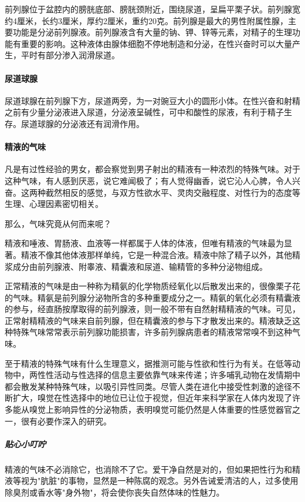 \begin{enumerate}
前列腺位于盆腔内的膀胱底部、膀胱颈附近，围绕尿道，呈扁平栗子状。前列腺宽约4厘米，长约3厘米，厚约2厘米，重约20克。前列腺是最大的男性附属性腺，主要功能是分泌前列腺液。前列腺液含有大量的钠、钾、锌等元素，对精子的生理功能有重要的影响。这种液体由腺体细胞不停地制造和分泌，在性兴奋时可以大量产生，平时有部分渗入润滑尿道。

\paragraph{尿道球腺}

尿道球腺在前列腺下方，尿道两旁，为一对豌豆大小的圆形小体。在性兴奋和射精之前有少量分泌液进入尿道，分泌液呈碱性，可中和酸性的尿液，有利于精子生存。尿道球腺的分泌液还有润滑作用。

\paragraph{精液的气味}

凡是有过性经验的男女，都会察觉到男子射出的精液有一种浓烈的特殊气味。对于这种气味，有人感到厌恶，说它难闻极了；有人觉得幽香，说它沁人心脾，令人兴奋。这两种截然相反的感觉，与双方性欲水平、灵肉交融程度、对性行为的态度等生理、心理因素密切相关。

那么，气味究竟从何而来呢？

精液和唾液、胃肠液、血液等一样都属于人体的体液，但唯有精液的气味最为显著。精液不像其他体液那样单纯，它是一种混合液。精液中除了精子以外，其他精浆成分由前列腺液、附睾液、精囊液和尿道、输精管的多种分泌物组成。

正常精液的气味是由一种称为精氨的化学物质经氧化以后散发出来的，很像栗子花的气味。精氨是前列腺分泌物所含的多种重要成分之一。精氨的氧化必须有精囊液的参与，经直肠按摩取得的前列腺液，则一般不带有自然射精精液的气味。可见，正常射精精液的气味来自前列腺，但在精囊液的参与下才散发出来的。精液缺乏这种特殊气味常常表示前列腺功能损害，许多前列腺病患者的精液常常嗅不到这种气味。

至于精液的特殊气味有什么生理意义，据推测可能与性欲和性行为有关。在低等动物中，两性性活动与性选择的信息主要依靠气味来传递；许多哺乳动物在发情期中都会散发某种特殊气味，以吸引异性同类。尽管人类在进化中接受性刺激的途径不断扩大，嗅觉在性选择中的地位已让位于视觉，但近年来科学家在人体内发现了许多能从嗅觉上影响异性的分泌物质，表明嗅觉可能仍然是人体重要的性感觉器官之一，很有必要作深入的研究。

\subparagraph{贴心小叮咛}

精液的气味不必消除它，也消除不了它。爱干净自然是对的，但如果把性行为和精液等视为"肮脏"的事物，显然是一种陈腐的观念。另外告诫爱清洁的人，过多使用除臭剂或香水等"身外物"，将会使你丧失自然体味的性魅力。


\end{enumerate}
